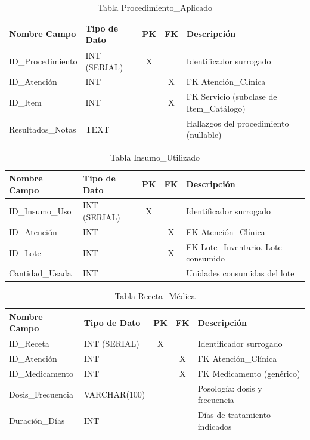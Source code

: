 \begin{table}[H]
\centering
\footnotesize
\begin{tabular}{|l|l|c|c|p{5cm}|}
\hline
\textbf{Nombre Campo} & \textbf{Tipo de Dato} & \textbf{PK} & \textbf{FK} & \textbf{Descripción} \\
\hline
ID\_Procedimiento & INT (SERIAL) & X & & Identificador surrogado \\
\hline
ID\_Atención & INT & & X & FK Atención\_Clínica \\
\hline
ID\_Item & INT & & X & FK Servicio (subclase de Item\_Catálogo) \\
\hline
Resultados\_Notas & TEXT & & & Hallazgos del procedimiento (nullable) \\
\hline
\end{tabular}
\caption{Tabla Procedimiento\_Aplicado}
\end{table}

\begin{table}[H]
\centering
\footnotesize
\begin{tabular}{|l|l|c|c|p{5cm}|}
\hline
\textbf{Nombre Campo} & \textbf{Tipo de Dato} & \textbf{PK} & \textbf{FK} & \textbf{Descripción} \\
\hline
ID\_Insumo\_Uso & INT (SERIAL) & X & & Identificador surrogado \\
\hline
ID\_Atención & INT & & X & FK Atención\_Clínica \\
\hline
ID\_Lote & INT & & X & FK Lote\_Inventario. Lote consumido \\
\hline
Cantidad\_Usada & INT & & & Unidades consumidas del lote \\
\hline
\end{tabular}
\caption{Tabla Insumo\_Utilizado}
\end{table}

\begin{table}[H]
\centering
\footnotesize
\begin{tabular}{|l|l|c|c|p{5cm}|}
\hline
\textbf{Nombre Campo} & \textbf{Tipo de Dato} & \textbf{PK} & \textbf{FK} & \textbf{Descripción} \\
\hline
ID\_Receta & INT (SERIAL) & X & & Identificador surrogado \\
\hline
ID\_Atención & INT & & X & FK Atención\_Clínica \\
\hline
ID\_Medicamento & INT & & X & FK Medicamento (genérico) \\
\hline
Dosis\_Frecuencia & VARCHAR(100) & & & Posología: dosis y frecuencia \\
\hline
Duración\_Días & INT & & & Días de tratamiento indicados \\
\hline
\end{tabular}
\caption{Tabla Receta\_Médica}
\end{table}

